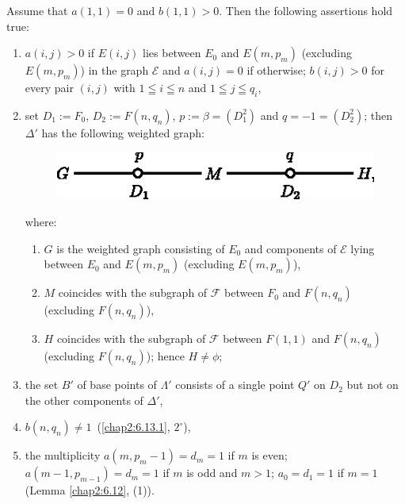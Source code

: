 \subsubsection{}\label{chap2:6.13.3}
Assume that $a(1,1)=0$ and $b(1,1)>0$. Then the following assertions
hold true:
\begin{enumerate}
\renewcommand{\labelenumi}{\theenumi$^{\circ}$}
\item $a(i,j)>0$ if $E(i,j)$ lies between $E_{0}$ and $E(m,p_{m})$
  (excluding $E(m,p_{m})$) in the graph $\mathscr{E}$ and $a(i,j)=0$
  if otherwise; $b(i,j)>0$ for every pair $(i,j)$ with $1\leqq i\leqq
  n$ and $1\leqq j\leqq q_{i}$,

\item set $D_{1}:=F_{0}$, $D_{2}:=F(n,q_{n})$, $p:=\beta=(D^{2}_{1})$
  and $q=-1=(D^{2}_{2})$; then $\Delta'$ has the following weighted
  graph:
\begin{figure}[H]
\centering
\includegraphics[scale=1.1]{figures/chap2-fig32.eps}
\end{figure}
\noindent
where: 
\begin{enumerate}
\renewcommand{\theenumii}{\roman{enumii}}
\renewcommand{\labelenumii}{\rm(\theenumii)}
\item $G$ is the weighted graph consisting of $E_{0}$ and
components of $\mathscr{E}$ lying between $E_{0}$ and $E(m,p_{m})$
(excluding $E(m,p_{m})$), 

\item $M$ coincides with the subgraph of $\mathscr{F}$ between $F_{0}$
  and \break $F(n,q_{n})$ (excluding $F(n,q_{n})$),

\item $H$ coincides with the subgraph of $\mathscr{F}$ between
  $F(1,1)$ and $F(n,q_{n})$ (excluding $F(n,q_{n})$); hence $H\neq \phi$;
\end{enumerate}

\item the set $B'$ of base points of $\Lambda'$ consists of a single
  point $Q'$ on $D_{2}$ but not on the other components of $\Delta'$,

\item $b(n,q_{n})\neq 1$\pageoriginale\ (\cf \ref{chap2:6.13.1},
  $2^{\circ}$),

\item the multiplicity $a(m,p_{m}-1)=d_{m}=1$ if $m$ is even;
  $a(m-1,p_{m-1})=d_{m}=1$ if $m$ is odd and $m>1$; $a_{0}=d_{1}=1$ if
  $m=1$ (\cf Lemma \ref{chap2:6.12}, (1)).
\end{enumerate}

